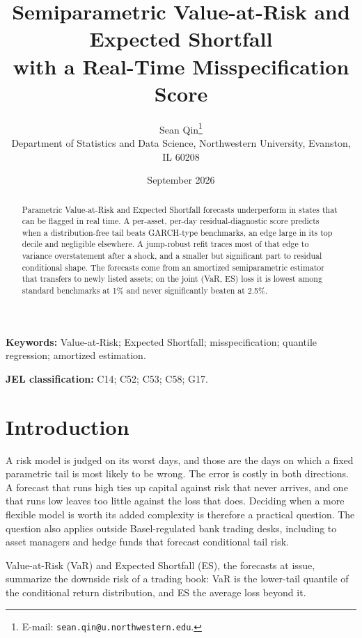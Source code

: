 \documentclass[11pt]{article}
\title{Semiparametric Value-at-Risk and Expected Shortfall\\
with a Real-Time Misspecification Score}
\author{%
  Sean Qin\thanks{E-mail: \texttt{sean.qin@u.northwestern.edu}.}\\[4pt]
  \normalsize Department of Statistics and Data Science, Northwestern
  University, Evanston, IL 60208}
\date{September 2026}
\theoremstyle{remark}
\begin{document}
\maketitle

\begin{abstract}
Parametric Value-at-Risk and Expected Shortfall forecasts underperform in states that can be flagged in real time. A per-asset, per-day residual-diagnostic
score predicts when a distribution-free tail beats
GARCH-type benchmarks, an edge large in its top decile and negligible
elsewhere. A jump-robust refit traces most of that edge to variance
overstatement after a shock, and a smaller but significant part to residual
conditional shape. The forecasts come from an amortized semiparametric estimator that transfers to newly listed assets; on the joint (VaR, ES) loss it is lowest among standard benchmarks at 1\% and never significantly beaten at 2.5\%.
\end{abstract}

\noindent\textbf{Keywords:} Value-at-Risk; Expected Shortfall;
misspecification; quantile regression; amortized estimation.

\medskip
\noindent\textbf{JEL classification:} C14; C52; C53; C58; G17.

\section*{Introduction}\label{sec:intro}

A risk model is judged on its worst days, and those are the days on which
a fixed parametric tail is most likely to be wrong. The error is costly in
both directions. A forecast that runs high ties up capital against risk
that never arrives, and one that runs low leaves too little against the
loss that does. Deciding when a more flexible model is worth its added
complexity is therefore a practical question. The question also applies outside Basel-regulated bank trading desks, including to asset managers and hedge funds that forecast conditional tail risk.

Value-at-Risk (VaR) and Expected Shortfall
(ES), the forecasts at issue, summarize the downside risk of a trading
book: VaR is the lower-tail quantile of the conditional return distribution, and
ES the average loss beyond it.
\end{document}
